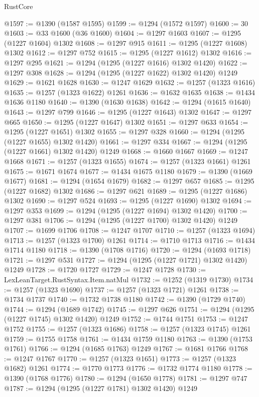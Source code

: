 \begin{lexlean}{RustCore}
\begin{coremodule}
@1597 := @1390 (@1587 @1595)
@1599 := @1294 (@1572 @1597)
@1600 := 30
@1603 := @33 @1600 (@36 @1600)
@1604 := @1297 @1603
@1607 := @1295 (@1227 @1604) @1302
@1608 := @1297 @915
@1611 := @1295 (@1227 @1608) @1302
@1612 := @1297 @752
@1615 := @1295 (@1227 @1612) @1302
@1616 := @1297 @295
@1621 := @1294 (@1295 (@1227 @1616) @1302 @1420)
@1622 := @1297 @308
@1628 := @1294 (@1295 (@1227 @1622) @1302 @1420) @1249
@1629 := @1621 @1628
@1630 := @1247 @1629
@1632 := @1257 (@1323 @1616)
@1635 := @1257 (@1323 @1622) @1261
@1636 := @1632 @1635
@1638 := @1434 @1636 @1180
@1640 := @1390 (@1630 @1638)
@1642 := @1294 (@1615 @1640)
@1643 := @1297 @799
@1646 := @1295 (@1227 @1643) @1302
@1647 := @1297 @665
@1650 := @1295 (@1227 @1647) @1302
@1651 := @1297 @633
@1654 := @1295 (@1227 @1651) @1302
@1655 := @1297 @328
@1660 := @1294 (@1295 (@1227 @1655) @1302 @1420)
@1661 := @1297 @334
@1667 := @1294 (@1295 (@1227 @1661) @1302 @1420) @1249
@1668 := @1660 @1667
@1669 := @1247 @1668
@1671 := @1257 (@1323 @1655)
@1674 := @1257 (@1323 @1661) @1261
@1675 := @1671 @1674
@1677 := @1434 @1675 @1180
@1679 := @1390 (@1669 @1677)
@1681 := @1294 (@1654 @1679)
@1682 := @1297 @657
@1685 := @1295 (@1227 @1682) @1302
@1686 := @1297 @621
@1689 := @1295 (@1227 @1686) @1302
@1690 := @1297 @524
@1693 := @1295 (@1227 @1690) @1302
@1694 := @1297 @353
@1699 := @1294 (@1295 (@1227 @1694) @1302 @1420)
@1700 := @1297 @381
@1706 := @1294 (@1295 (@1227 @1700) @1302 @1420) @1249
@1707 := @1699 @1706
@1708 := @1247 @1707
@1710 := @1257 (@1323 @1694)
@1713 := @1257 (@1323 @1700) @1261
@1714 := @1710 @1713
@1716 := @1434 @1714 @1180
@1718 := @1390 (@1708 @1716)
@1720 := @1294 (@1693 @1718)
@1721 := @1297 @531
@1727 := @1294 (@1295 (@1227 @1721) @1302 @1420) @1249
@1728 := @1720 @1727
@1729 := @1247 @1728
@1730 := LexLeanTarget.RustSyntax.Item.natMul
@1732 := @1252 (@1319 @1730)
@1734 := @1257 (@1323 @1690)
@1737 := @1257 (@1323 @1721) @1261
@1738 := @1734 @1737
@1740 := @1732 @1738 @1180
@1742 := @1390 (@1729 @1740)
@1744 := @1294 (@1689 @1742)
@1745 := @1297 @626
@1751 := @1294 (@1295 (@1227 @1745) @1302 @1420) @1249
@1752 := @1744 @1751
@1753 := @1247 @1752
@1755 := @1257 (@1323 @1686)
@1758 := @1257 (@1323 @1745) @1261
@1759 := @1755 @1758
@1761 := @1434 @1759 @1180
@1763 := @1390 (@1753 @1761)
@1766 := @1294 (@1685 @1763) @1249
@1767 := @1681 @1766
@1768 := @1247 @1767
@1770 := @1257 (@1323 @1651)
@1773 := @1257 (@1323 @1682) @1261
@1774 := @1770 @1773
@1776 := @1732 @1774 @1180
@1778 := @1390 (@1768 @1776)
@1780 := @1294 (@1650 @1778)
@1781 := @1297 @747
@1787 := @1294 (@1295 (@1227 @1781) @1302 @1420) @1249

\end{coremodule}
\end{lexlean}
